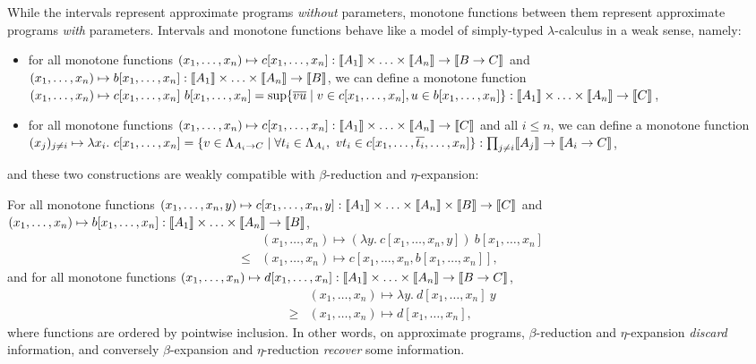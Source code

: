 While the intervals represent approximate programs \emph{without} parameters, monotone functions between them represent approximate programs \emph{with} parameters. Intervals and monotone functions behave like a model of simply-typed $\lambda$-calculus in a weak sense, namely: \begin{itemize}
\item for all monotone functions $(x_1, \ldots, x_n) \mapsto c[x_1, \ldots, x_n] : \llbracket A_1 \rrbracket \times \ldots \times \llbracket A_n \rrbracket \to \llbracket B \to C \rrbracket$ and $(x_1, \ldots, x_n) \mapsto b[x_1, \ldots, x_n] : \llbracket A_1 \rrbracket \times \ldots \times \llbracket A_n \rrbracket \to \llbracket B \rrbracket$, we can define a monotone function $(x_1, \ldots, x_n) \mapsto c[x_1, \ldots, x_n]~ b[x_1, \ldots, x_n] = \sup\{\overline{vu} \mid v \in c[x_1, \ldots, x_n], u \in b[x_1, \ldots, x_n]\} : \llbracket A_1 \rrbracket \times \ldots \times \llbracket A_n \rrbracket \to \llbracket C \rrbracket$,
\item for all monotone functions $(x_1, \ldots, x_n) \mapsto c[x_1, \ldots, x_n] : \llbracket A_1 \rrbracket \times \ldots \times \llbracket A_n \rrbracket \to \llbracket C \rrbracket$ and all $i \leq n$, we can define a monotone function $(x_j)_{j \neq i} \mapsto \lambda x_i.~ c[x_1, \ldots, x_n] = \{ v \in \Lambda_{A_i \to C} \mid \forall t_i \in \Lambda_{A_i},~ v t_i \in c[x_1, \ldots, \overline{t_i}, \ldots, x_n] \} : \prod_{j \neq i} \llbracket A_j \rrbracket \to \llbracket A_i \to C \rrbracket$,
\end{itemize}
and these two constructions are weakly compatible with $\beta$-reduction and $\eta$-expansion:

\begin{proposition} \label{prop:intervals-weak-model-lambda} For all monotone functions $(x_1, \ldots, x_n, y) \mapsto c[x_1, \ldots, x_n, y] : \llbracket A_1 \rrbracket \times \ldots \times \llbracket A_n \rrbracket \times  \llbracket B \rrbracket \to \llbracket C \rrbracket$ and $(x_1, \ldots, x_n) \mapsto b[x_1, \ldots, x_n] : \llbracket A_1 \rrbracket \times \ldots \times \llbracket A_n \rrbracket \to \llbracket B \rrbracket$, $$\begin{array}{ll} & (x_1, \ldots, x_n) \mapsto (\lambda y.~  c[x_1, \ldots, x_n, y])~ b[x_1, \ldots, x_n] \\ \leq & (x_1, \ldots, x_n) \mapsto c[x_1, \ldots, x_n, b[x_1, \ldots, x_n]]\text{,}\end{array}$$
and for all monotone functions $(x_1, \ldots, x_n) \mapsto d[x_1, \ldots, x_n] : \llbracket A_1 \rrbracket \times \ldots \times \llbracket A_n \rrbracket \to  \llbracket B \to C \rrbracket$,
$$\begin{array}{ll} & (x_1, \ldots, x_n) \mapsto \lambda y.~  d[x_1, \ldots, x_n]~ y \\ \geq & (x_1, \ldots, x_n) \mapsto d[x_1, \ldots, x_n]\text{,}\end{array}$$
where functions are ordered by pointwise inclusion.  In other words, on approximate programs, $\beta$-reduction and $\eta$-expansion \emph{discard} information, and conversely $\beta$-expansion and $\eta$-reduction \emph{recover} some information.
\end{proposition}

